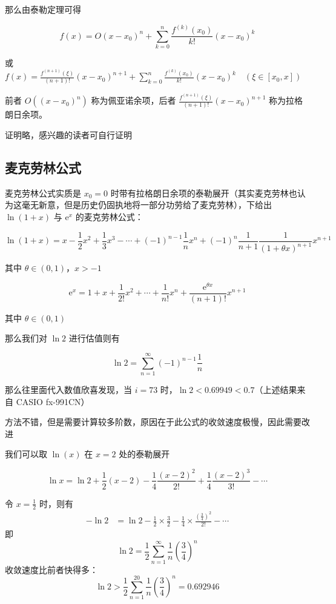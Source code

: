 \documentclass[12pt]{article}
\theoremstyle{definition}
\theoremstyle{plain}
\theoremstyle{definition}
\newcommand{\ee}{\mathrm{e}}
\begin{document}
那么由泰勒定理可得

\[f(x) = O\left( x - x_{0} \right)^{n} + \sum_{k = 0}^{n}\frac{f^{(k)}\left( x_{0} \right)}{k!}\left( x - x_{0} \right)^{k}\]

或
\(f(x) = \frac{f^{(n + 1)}(\xi)}{(n + 1)!}\left( x - x_{0} \right)^{n + 1} + \sum_{k = 0}^{n}\frac{f^{(k)}\left( x_{0} \right)}{k!}\left( x - x_{0} \right)^{k}\quad\left( \xi \in \left\lbrack x_{0},x \right\rbrack \right)\)

前者 $O((x - x_0)^n)$ 称为佩亚诺余项，后者 \(\frac{f^{(n+1)}(\xi)}{(n + 1)!}(x - x_0)^{n + 1}\) 称为拉格朗日余项。

证明略，感兴趣的读者可自行证明

\subsection{麦克劳林公式}

麦克劳林公式实质是 \(x_0=0\) 时带有拉格朗日余项的泰勒展开（其实麦克劳林也认为这毫无新意，但是历史仍固执地将一部分功劳给了麦克劳林），下给出 \(\ln(1+x)\) 与 \(\mathrm{e}^{x}\) 的麦克劳林公式：

\[\ln(1 + x) = x - \frac{1}{2}x^{2} + \frac{1}{3}x^{3} - \cdots + ( - 1)^{n - 1}\frac{1}{n}x^{n} + ( - 1)^{n}\frac{1}{n + 1}\frac{1}{(1 + \theta x)^{n + 1}}x^{n + 1}\]

其中 \(\theta \in (0,1)\)，\(x > -1\)

\[\ee^{x} = 1 + x + \frac{1}{2!}x^{2} + \cdots + \frac{1}{n!}x^{n} + \frac{\ee^{\theta x}}{(n + 1)!}x^{n + 1}\]

其中 \(\theta \in (0,1)\)

那么我们对 \(\ln 2\) 进行估值则有

\[\ln 2 = \sum_{n = 1}^{\infty}( - 1)^{n - 1}\frac{1}{n}\]

那么往里面代入数值欣喜发现，当 \(i=73\) 时，\(\ln 2 < 0.69949 < 0.7\)（上述结果来自 CASIO fx-991CN）

方法不错，但是需要计算较多阶数，原因在于此公式的收敛速度极慢，因此需要改进

我们可以取 \(\ln(x)\) 在 \(x=2\) 处的泰勒展开

\[\ln x = \ln 2 + \frac{1}{2}(x - 2) - \frac{1}{4}\frac{(x - 2)^{2}}{2!} + \frac{1}{4}\frac{(x - 2)^{3}}{3!} - \cdots\]

令 \(x = \frac{1}{2}\) 时，则有
\begin{align*}
-\ln 2 &= \ln 2 - \frac{1}{2} \times \frac{3}{2} - \frac{1}{4} \times \frac{\left( \frac{3}{4} \right)^{2}}{2!} - \cdots
\end{align*}
即
\[\ln 2 = \frac{1}{2}\sum_{n = 1}^{\infty}\frac{1}{n}\left( \frac{3}{4} \right)^{n}\]
收敛速度比前者快得多：
\[\ln 2 > \frac{1}{2}\sum_{n = 1}^{20}\frac{1}{n}\left( \frac{3}{4} \right)^{n} = 0.692946\]
\end{document}
